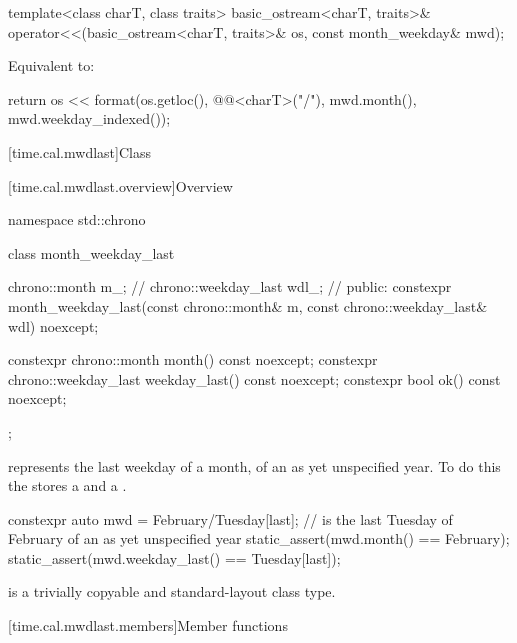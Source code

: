 %
\begin{itemdecl}
template<class charT, class traits>
  basic_ostream<charT, traits>&
    operator<<(basic_ostream<charT, traits>& os, const month_weekday& mwd);
\end{itemdecl}

\begin{itemdescr}
\pnum
\effects
Equivalent to:
\begin{codeblock}
return os << format(os.getloc(), @@<charT>("{}/{}"),
                    mwd.month(), mwd.weekday_indexed());
\end{codeblock}
\end{itemdescr}

[time.cal.mwdlast]{Class }

[time.cal.mwdlast.overview]{Overview}

\begin{codeblock}
namespace std::chrono {
  class month_weekday_last {
    chrono::month        m_;    // \expos
    chrono::weekday_last wdl_;  // \expos
  public:
    constexpr month_weekday_last(const chrono::month& m,
                                 const chrono::weekday_last& wdl) noexcept;

    constexpr chrono::month        month()        const noexcept;
    constexpr chrono::weekday_last weekday_last() const noexcept;
    constexpr bool ok() const noexcept;
  };
}
\end{codeblock}

\pnum
{} represents the last weekday of a month,
of an as yet unspecified year.
To do this the  stores a  and a .

\pnum
\begin{example}
\begin{codeblock}
constexpr auto mwd
    = February/Tuesday[last];   //  is the last Tuesday of February of an as yet unspecified year
static_assert(mwd.month() == February);
static_assert(mwd.weekday_last() == Tuesday[last]);
\end{codeblock}
\end{example}

\pnum
{} is a trivially copyable and standard-layout class type.

[time.cal.mwdlast.members]{Member functions}

